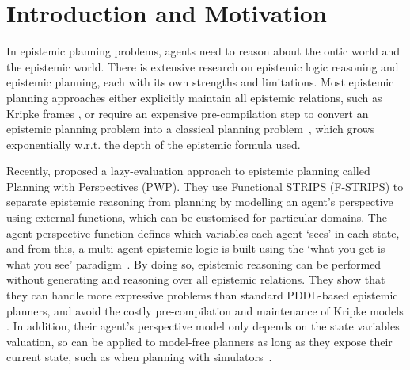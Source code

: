 \section{Introduction and Motivation}
\label{sec:intro}
In epistemic planning problems, agents need to reason about the ontic world and the epistemic world. 
There is extensive research on epistemic logic reasoning and epistemic planning, each with its own strengths and limitations. 
Most epistemic planning approaches either explicitly maintain all epistemic relations, such as Kripke frames \cite{DBLP:conf/aips/KominisG15,DBLP:journals/jancl/BolanderA11,DBLP:conf/ecsi/Bolander14}, or require an expensive pre-compilation step to convert an epistemic planning problem into a classical planning problem~\cite{DBLP:journals/ai/MuiseBFMMPS22}, which grows exponentially w.r.t. the depth of the epistemic formula used.

Recently, \citet{Hu2022-ul} proposed a lazy-evaluation approach to epistemic planning called Planning with Perspectives (PWP).
They use Functional STRIPS (F-STRIPS) \cite{geffner2000functional} to separate epistemic reasoning from planning by modelling an agent's perspective using external functions, which can be customised for particular domains. 
The agent perspective function defines which variables each agent `sees' in each state, and from this, a multi-agent epistemic logic is built using the `what you get is what you see' paradigm~\cite{DBLP:conf/atal/GasquetGS14,DBLP:conf/ecsi/Bolander14,DBLP:conf/ecai/CooperHMMR16,DBLP:conf/lori/HerzigLM15}.
By doing so, epistemic reasoning can be performed without generating and reasoning over all epistemic relations. 
They show that they can handle more expressive problems than standard PDDL-based epistemic planners, and avoid the costly pre-compilation \cite{DBLP:conf/aaai/MuiseBFMMPS15,DBLP:journals/ai/MuiseBFMMPS22} and maintenance of Kripke models \cite{DBLP:journals/corr/Bolander17,DBLP:conf/aips/KominisG15,DBLP:conf/aips/LeFSP18,DBLP:conf/aips/FabianoBDP20,DBLP:journals/corr/abs-1909-13778/Causal_Belief_Decomposition_for_Planning_with_Sensing}.
In addition, their agent's perspective model only depends on the state variables valuation, so can be applied to model-free planners as long as they expose their current state, such as when planning with simulators~\cite{DBLP:conf/ijcai/FrancesRLG17}.

